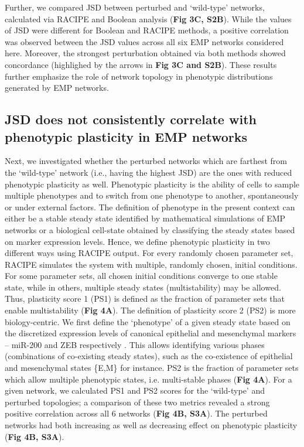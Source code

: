 \documentclass[preprint,review,12pt]{elsarticle}
\begin{document}
	Further, we compared JSD between perturbed and ‘wild-type’ networks, calculated via RACIPE and Boolean analysis (\textbf{Fig 3C, S2B}). While the values of JSD were different for Boolean and RACIPE methods, a positive correlation was observed between the JSD values across all six EMP networks considered here. Moreover, the strongest perturbation obtained via both methods showed concordance (highlighed by the arrows in \textbf{Fig 3C and S2B}). These results further emphasize the role of network topology in phenotypic distributions generated by EMP networks.
	
	\subsection{JSD does not consistently correlate with phenotypic plasticity in EMP networks}
	Next, we investigated whether the perturbed networks which are farthest from the ‘wild-type’ network (i.e., having the highest JSD) are the ones with reduced phenotypic plasticity as well. Phenotypic plasticity is the ability of cells to sample multiple phenotypes and to switch from one phenotype to another, spontaneously or under external factors. The definition of phenotype in the present context can either be a stable steady state identified by mathematical simulations of EMP networks or a biological cell-state obtained by classifying the steady states based on marker expression levels. Hence, we define phenotypic plasticity in two different ways using RACIPE output. For every randomly chosen parameter set, RACIPE simulates the system with multiple, randomly chosen, initial conditions. For some parameter sets, all chosen initial conditions converge to one stable state, while in others, multiple steady states (multistability) may be allowed.  Thus, plasticity score 1 (PS1) is defined as the fraction of parameter sets that enable multistability (\textbf{Fig 4A}). The definition of plasticity score 2 (PS2) is more biology-centric. We first define the ‘phenotype’ of a given steady state based on the discretized expression levels of canonical epithelial and mesenchymal markers – miR-200 and ZEB respectively \cite{Brabletz2010, Lu2013, Tian2013}. This allows identifying various phases (combinations of co-existing steady states), such as the co-existence of epithelial and mesenchymal states \{E,M\} for instance. PS2 is the fraction of parameter sets which allow multiple phenotypic states, i.e. multi-stable phases (\textbf{Fig 4A}). For a given network, we calculated PS1 and PS2 scores for the ‘wild-type’ and perturbed topologies; a comparison of these two metrics revealed a strong positive correlation across all 6 networks (\textbf{Fig 4B, S3A}). The perturbed networks had both increasing as well as decreasing effect on phenotypic plasticity (\textbf{Fig 4B, S3A}).
	
\end{document}
